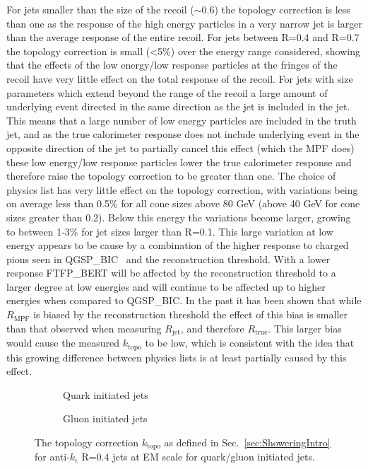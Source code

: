 For jets smaller than the size of the recoil ($\sim$0.6) the topology correction is less than one as the response of the high energy particles in a very narrow jet is larger than the average response of the entire recoil.  
For jets between R=0.4 and R=0.7 the topology correction is small (<5\%) over the energy range considered, showing that the effects of the low energy/low response particles at the fringes of the recoil have very little effect on the total response of the recoil.  
For jets with size parameters which extend beyond the range of the recoil a large amount of underlying event directed in the same direction as the jet is included in the jet.  
This means that a large number of low energy particles are included in the truth jet, and as the true calorimeter response does not include underlying event in the opposite direction of the jet to partially cancel this effect (which the MPF does) these low energy/low response particles lower the true calorimeter response and therefore raise the topology correction to be greater than one.  
The choice of physics list has very little effect on the topology correction, with variations being on average less than 0.5\% for all cone sizes above 80 GeV (above 40 GeV for cone sizes greater than 0.2).   
Below this energy the variations become larger, growing to between 1-3\% for jet sizes larger than R=0.1.  
This large variation at low energy appears to be cause by a combination of the higher response to charged pions seen in QGSP\_BIC~\cite{Zhang:2253040} and the reconstruction threshold.  
With a lower response FTFP\_BERT will be affected by the reconstruction threshold to a larger degree at low energies and will continue to be affected up to higher energies when compared to QGSP\_BIC.
In the past it has been shown that while $R_{\mathrm{MPF}}$ is biased by the reconstruction threshold the effect of this bias is smaller than that observed when measuring $R_{\mathrm{jet}}$, and therefore $R_{\mathrm{true}}$.
This larger bias would cause the measured $k_{\mathrm{topo}}$ to be low, which is consistent with the idea that this growing difference between physics lists is at least partially caused by this effect.


\begin{figure}[!ht]
  \centering
  \begin{subfigure}{.5\textwidth}
    \centering
    \caption{Quark initiated jets}
  \end{subfigure}%
  \begin{subfigure}{.5\textwidth}  \centering
    \caption{Gluon initiated jets}
  \end{subfigure}
  \caption[Topology correction for quark/gluon initiated jets.]
{\small The topology correction $k_{\mathrm{topo}}$ as defined in Sec.~\ref{sec:ShoweringIntro} for anti-$k_\mathrm{t}$ R=0.4 jets at EM scale for quark/gluon initiated jets.  }
  \label{Fig:TopoCorr_QG4}
\end{figure}

